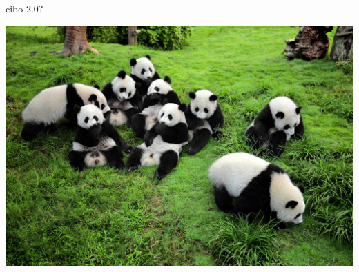 \documentclass[presentation]{beamer}
\begin{document}
\begin{frame}[label={sec:org219df8c}]{}
\end{frame}
\begin{frame}[label={sec:org9c07088}]{cibo 2.0?}
\begin{center}
\includegraphics[width=.9\linewidth]{./immagini/pandas.jpg}
\end{center}
\end{frame}
\end{document}
